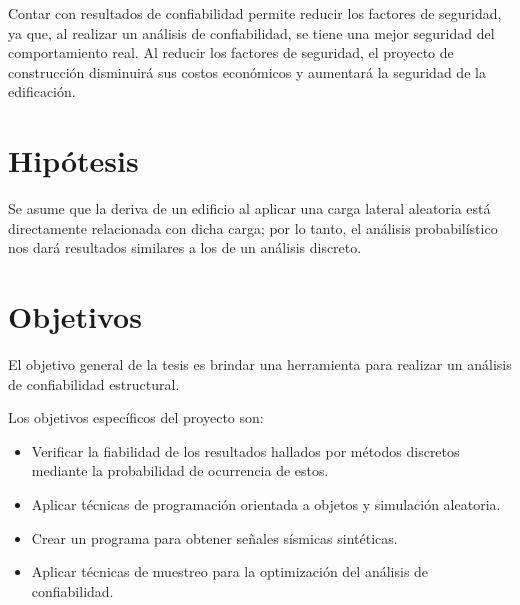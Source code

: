 Contar con resultados de confiabilidad permite reducir los factores de seguridad, ya que, al realizar un análisis de confiabilidad, se tiene una mejor seguridad del comportamiento real. Al reducir los factores de seguridad, el proyecto de construcción disminuirá sus costos económicos y aumentará la seguridad de la edificación.

\section{Hipótesis}
Se asume que la deriva de un edificio al aplicar una carga lateral aleatoria está directamente relacionada con dicha carga; por lo tanto, el análisis probabilístico nos dará resultados similares a los de un análisis discreto.

\section{Objetivos}
El objetivo general de la tesis es brindar una herramienta para realizar un análisis de confiabilidad estructural.

Los objetivos específicos del proyecto son:
\begin{itemize}
    \item Verificar la fiabilidad de los resultados hallados por métodos discretos mediante la probabilidad de ocurrencia de estos.
    \item Aplicar técnicas de programación orientada a objetos y simulación aleatoria.
    \item Crear un programa para obtener señales sísmicas sintéticas.
    \item Aplicar técnicas de muestreo para la optimización del análisis de confiabilidad.
\end{itemize}
